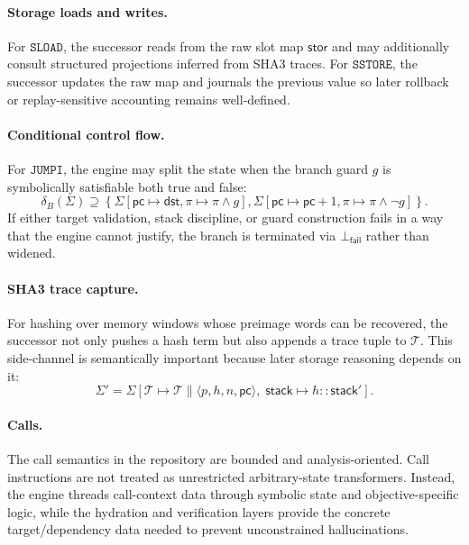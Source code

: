 \documentclass[11pt]{article}
\numberwithin{equation}{section}
\theoremstyle{remark}
\newcommand{\Fail}{\bot_{\mathsf{fail}}}
\newcommand{\Trace}{\mathcal{T}}
\newcommand{\Path}{\pi}
\newcommand{\Storage}{\mathsf{stor}}
\newcommand{\Stack}{\mathsf{stack}}
\newcommand{\PC}{\mathsf{pc}}
\newcommand{\Concat}{\mathbin{\|}}
\begin{document}
\paragraph{Storage loads and writes.}
For \(\texttt{SLOAD}\), the successor reads from the raw slot map \(\Storage\) and may additionally consult structured projections inferred from SHA3 traces. For \(\texttt{SSTORE}\), the successor updates the raw map and journals the previous value so later rollback or replay-sensitive accounting remains well-defined.

\paragraph{Conditional control flow.}
For \(\texttt{JUMPI}\), the engine may split the state when the branch guard \(g\) is symbolically satisfiable both true and false:
\begin{equation}
\label{eq:jumpi}
\delta_B(\Sigma)
\supseteq
\left\{
\Sigma[\PC \mapsto \mathsf{dst}, \Path \mapsto \Path \land g],
\Sigma[\PC \mapsto \PC + 1, \Path \mapsto \Path \land \neg g]
\right\}.
\end{equation}
If either target validation, stack discipline, or guard construction fails in a way that the engine cannot justify, the branch is terminated via \(\Fail\) rather than widened.

\paragraph{SHA3 trace capture.}
For hashing over memory windows whose preimage words can be recovered, the successor not only pushes a hash term but also appends a trace tuple to \(\Trace\). This side-channel is semantically important because later storage reasoning depends on it:
\begin{equation}
\label{eq:sha3-side-effect}
\Sigma'
=
\Sigma[
\Trace \mapsto \Trace \Concat \langle p, h, n, \PC \rangle,\;
\Stack \mapsto h :: \Stack'
].
\end{equation}

\paragraph{Calls.}
The call semantics in the repository are bounded and analysis-oriented. Call instructions are not treated as unrestricted arbitrary-state transformers. Instead, the engine threads call-context data through symbolic state and objective-specific logic, while the hydration and verification layers provide the concrete target/dependency data needed to prevent unconstrained hallucinations.
\end{document}
